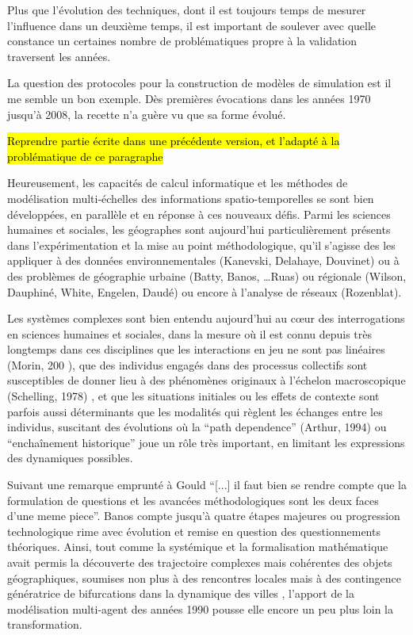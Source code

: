 Plus que l'évolution des techniques, dont il est toujours temps de mesurer l'influence dans un deuxième temps, il est important de soulever avec quelle constance un certaines nombre de problématiques propre à la validation traversent les années. 

La question des protocoles pour la construction de modèles de simulation est il me semble un bon exemple. Dès premières évocations dans les années 1970 jusqu'à 2008, la recette n'a guère vu que sa forme évolué.



\hl{Reprendre partie écrite dans une précédente version, et l'adapté à la problématique de ce paragraphe}


Heureusement, les capacités de calcul informatique et les méthodes de modélisation multi-échelles des informations spatio-temporelles se sont bien développées, en parallèle et en réponse à ces nouveaux défis. Parmi les sciences humaines et sociales, les géographes sont aujourd'hui particulièrement présents dans l’expérimentation et la mise au point méthodologique, qu’il s’agisse des les appliquer à des données environnementales (Kanevski, Delahaye, Douvinet) ou à des problèmes de géographie urbaine (Batty, Banos, …Ruas) ou régionale (Wilson, Dauphiné, White, Engelen, Daudé) ou encore à l’analyse de réseaux (Rozenblat). 

Les systèmes complexes sont bien entendu aujourd'hui au cœur des interrogations en sciences humaines et sociales, dans la mesure où il est connu depuis très longtemps dans ces disciplines que les interactions en jeu ne sont pas linéaires   (Morin, 200 ), que des individus engagés dans des processus collectifs sont susceptibles de donner lieu à des phénomènes originaux à l’échelon macroscopique (Schelling, 1978) , et que les situations initiales ou les effets de contexte sont parfois aussi déterminants que les modalités qui règlent les échanges entre les individus, suscitant des évolutions où la \foreignquote{english}{path dependence}  (Arthur, 1994) ou \enquote{enchaînement historique} joue un rôle très important, en limitant les expressions des dynamiques possibles.

Suivant une remarque emprunté à Gould \autocite[31]{Gould2004} \enquote{[...] il faut bien se rendre compte que la formulation de questions et les avancées méthodologiques sont les deux faces d'une meme piece}. Banos \autocite{Banos2013} compte jusqu'à quatre étapes majeures ou progression technologique rime avec évolution et remise en question des questionnements théoriques. Ainsi, tout comme la systémique et la formalisation mathématique avait permis la découverte des trajectoire complexes mais cohérentes des objets géographiques, soumises non plus à des rencontres locales mais à des contingence génératrice de bifurcations dans la dynamique des villes \autocite[137]{Pumain2002}, l'apport de la modélisation multi-agent des années 1990 pousse elle encore un peu plus loin la transformation. \autocite{Sanders2007}

